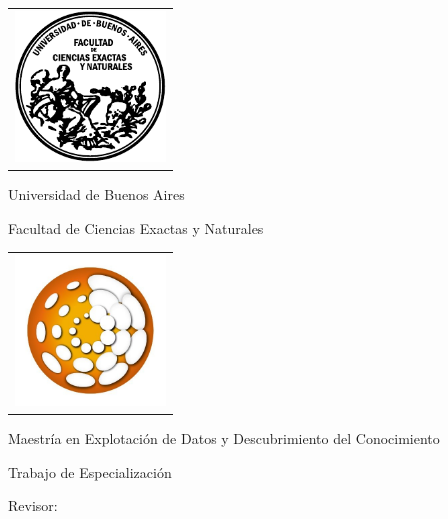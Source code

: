 \newcommand{\HRule}{\rule{\linewidth}{0.2mm}}
%
\thispagestyle{empty}

\begin{center}\leavevmode

\vspace{-2cm}

\begin{tabular}{l}
\includegraphics[width=4cm]{caratula/logofcen.pdf}
\end{tabular}

{\large \sc Universidad de Buenos Aires

Facultad de Ciencias Exactas y Naturales}


\begin{tabular}{l}
\includegraphics[width=4cm]{caratula/logo_UBA_DM.jpeg}
\end{tabular}

{\large \sc Maestría en Explotación de Datos y Descubrimiento del Conocimiento}


\vspace{4.0cm}


\begin{huge}
\textbf{\tituloTesis}
\end{huge}

\vspace{2cm}

{\large Trabajo de Especialización}

\vspace{2cm}

{\Large \autor}

\end{center}

\vfill

{\large


\vspace{.2cm}

{Revisor: \codirector}

\vspace{.2cm}

\lugar
}

\newpage\thispagestyle{empty}

